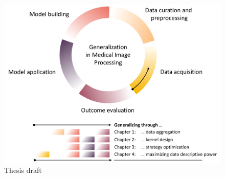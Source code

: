     \begin{figure}
        \label{fig:draft}
        \includegraphics[width=\textwidth]{sections/01_introduction/figures/draft.pdf}
        \caption{Thesis draft}

    \end{figure}